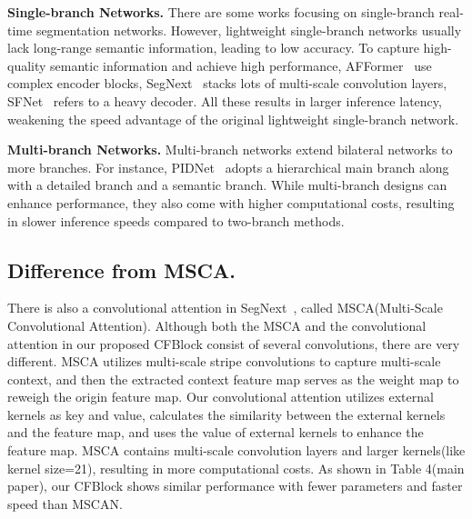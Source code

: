 \documentclass[letterpaper]{article} %
\begin{document}
\noindent
\textbf{Single-branch Networks.} There are some works focusing on single-branch real-time segmentation networks. However, lightweight single-branch networks usually lack long-range semantic information, leading to low accuracy. To capture high-quality semantic information and achieve high performance, AFFormer~\cite{dong2023afformer} use complex encoder blocks, SegNext~\cite{guo2022segnext} stacks lots of multi-scale convolution layers, SFNet~\cite{li2022sfnet} refers to a heavy decoder. All these results in larger inference latency, weakening the speed advantage of the original lightweight single-branch network.


\noindent
\textbf{Multi-branch Networks.} Multi-branch networks extend bilateral networks to more branches. For instance, PIDNet~\cite{xu2023pidnet} adopts a hierarchical main branch along with a detailed branch and a semantic branch. While multi-branch designs can enhance performance, they also come with higher computational costs, resulting in slower inference speeds compared to two-branch methods.




\subsection{Difference from MSCA.} 
There is also a convolutional attention in SegNext~\cite{guo2022segnext}, called MSCA(Multi-Scale Convolutional Attention). Although both the MSCA and the convolutional attention in our proposed CFBlock consist of several convolutions, there are very different. MSCA utilizes multi-scale stripe convolutions to capture multi-scale context, and then the extracted context feature map serves as the weight map to reweigh the origin feature map. Our convolutional attention utilizes external kernels as key and value, calculates the similarity between the external kernels and the feature map, and uses the value of external kernels to enhance the feature map. MSCA contains multi-scale convolution layers and larger kernels(like kernel size=21), resulting in more computational costs. As shown in Table 4(main paper), our CFBlock shows similar performance with fewer parameters and faster speed than MSCAN.
\end{document}
